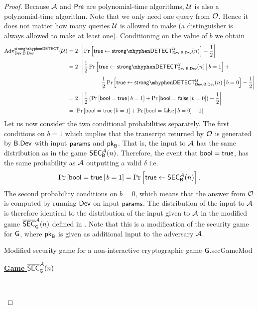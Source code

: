 \begin{proof}
Because $\mathcal{A}$ and $\operatorname{\mathsf{Pre}}$ are polynomial-time algorithms, $\mathcal{U}$ is also a polynomial-time algorithm. Note that we only need one query from $\operatorname{\mathcal{O}}$. Hence it does not matter how many queries $\mathcal{U}$ is allowed to make (a distinguisher is always allowed to make at least one).  Conditioning on the value of $b$ we obtain
\begin{align}
	\adv_{\dev,\bbdev}^{\strongdetectplain}(\user) & = 2\cdot \left\vert \prob{\true\leftarrow \strongdetect{\dev}{\bbdev}{\user}} - \frac{1}{2} \right\vert  \nonumber \\
	&  = 2\cdot \bigg\vert \frac{1}{2}\prob{\true\leftarrow \strongdetect{\dev}{\bbdev}{\user}\,\big\vert\,b = 1} +  \nonumber \\
	&\qquad\qquad\qquad \frac{1}{2}\prob{\true\leftarrow \strongdetect{\dev}{\bbdev}{\user}\,\big\vert\,b = 0} - \frac{1}{2} \bigg\vert\nonumber \\
	& = 2\cdot \left\vert \frac{1}{2}\left( \condprob{\bool = \true}{b = 1} + \condprob{\bool = \false}{b = 0}\right) - \frac{1}{2} \right\vert  \nonumber \\
\label{eq:cha3_0} 	& = \left\vert \condprob{\bool = \true}{b = 1} + \condprob{\bool = \false}{b = 0} -1 \right\vert.
\end{align}
Let us now consider the two conditional probabilities separately. The first conditions on $b = 1$ which implies that the transcript returned by $\operatorname{\mathcal{O}}$ is generated by $\mathsf{B}.\mathsf{Dev}$ with input $\mathsf{params}$ and $\mathsf{pk}_{\mathsf{B}}$. That is, the input to $\mathcal{A}$ has the same distribution as in the game $\mathsf{SEC}_{\mathsf{B}}^{\mathcal{A}}(n)$. Therefore, the event that $\mathsf{bool} = \mathsf{true}$, has the same probability as $\mathcal{A}$ outputting a valid $\delta$ i.e.
\begin{align}
\label{eq:cha3_1}
	\operatorname{Pr}\left[\mathsf{bool} = \mathsf{true}\,\vert\,b = 1\right] = \operatorname{Pr}\left[{\mathsf{true} \leftarrow \mathsf{SEC}_{\mathsf{B}}^{\mathcal{A}}(n)}\right].
\end{align}
The second probability conditions on $b = 0$, which means that the answer from $\operatorname{\mathcal{O}}$ is computed by running $\operatorname{\mathsf{Dev}}$ on input $\mathsf{params}$. The distribution of the input to $\mathcal{A}$ is therefore identical to the distribution of the input given to $\mathcal{A}$ in the modified game $\overline{\mathstrut\mathsf{SEC}}_{\operatorname{\mathsf{G}}}^{\mathcal{A}}(n)$ defined in . Note that this is a modification of the security game for $\operatorname{\mathsf{G}}$, where $\mathsf{pk}_{\mathsf{B}}$ is given as additional input to the adversary $\mathcal{A}$. 

\begin{boxfigGame}{Modified security game for a non-interactive cryptographic game $\operatorname{\mathsf{G}}$.}{secGameMod}
  \begin{description}
	\item[\underline{\textbf{Game} $\overline{\mathstrut\mathsf{SEC}}_{\operatorname{\mathsf{G}}}^{\mathcal{A}}(n)$}] ~
 	

\end{description}
\end{boxfigGame}
\end{proof}
